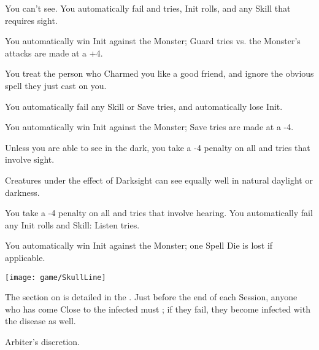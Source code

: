 \begin{multicols*}{2}

  You can't see. You automatically fail \RO and \RB tries, Init rolls, and any Skill that requires sight.

    You automatically win Init against the Monster; Guard tries vs. the Monster's attacks are made at a +4.


  You treat the person who Charmed you like a good friend, and ignore the obvious spell they just cast on you.


  You automatically fail any Skill or Save tries, and automatically lose Init.

   You automatically win Init against the Monster;  Save tries are made at a -4.


  Unless you are able to see in the dark, you take a -4 penalty on all \RO and \RB tries that involve sight.


  Creatures under the effect of Darksight can see equally well in natural daylight or darkness.


  You take a -4 penalty on all \RO and \RB tries that involve hearing.  You automatically fail any Init rolls and Skill: Listen tries.

    You automatically win Init against the Monster; one Spell Die is lost if applicable.

    \texttt{[image: game/SkullLine]}

\cbreak


  The section on  is detailed in the . Just before the end of each Session, anyone who has come Close to the infected must \RSTRY{\VIG}; if they fail, they become infected with the disease as well.

  Arbiter's discretion.



\end{multicols*}
